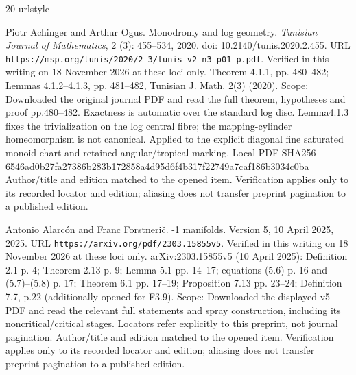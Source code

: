 \documentclass[11pt,a4paper]{article}
\theoremstyle{definition}
\begin{document}
\clearpage
\begin{thebibliography}{20}
\providecommand{\natexlab}[1]{#1}
\providecommand{\url}[1]{\texttt{#1}}
\expandafter\ifx\csname urlstyle\endcsname\relax
  \providecommand{\doi}[1]{doi: #1}\else
  \providecommand{\doi}{doi: \begingroup \urlstyle{rm}\Url}\fi

Piotr Achinger and Arthur Ogus.
\newblock Monodromy and log geometry.
\newblock \emph{Tunisian Journal of Mathematics}, 2 (3):
  455--534, 2020.
\newblock \doi{10.2140/tunis.2020.2.455}.
\newblock URL \url{https://msp.org/tunis/2020/2-3/tunis-v2-n3-p01-p.pdf}.
\newblock Verified in this writing on 18 November 2026 at these loci only.
  Theorem 4.1.1, pp. 480–482;\allowbreak{} Lemmas 4.1.2–4.1.3, pp. 481–482, Tunisian
  J. Math. 2(3) (2020). Scope: Downloaded the original journal PDF and read the
  full theorem, hypotheses and proof pp.480–482. Exactness is automatic over
  the standard log disc. Lemma4.1.3 fixes the trivialization on the log central
  fibre;\allowbreak{} the mapping-cylinder homeomorphism is not canonical. Applied to the
  explicit diagonal fine saturated monoid chart and retained angular/tropical
  marking. Local PDF SHA256
  6546ad0b27fa27386b283b172858a4d95d6f4b317f22749a7caf186b3034c0ba Author/title
  and edition matched to the opened item. Verification applies only to its
  recorded locator and edition;\allowbreak{} aliasing does not transfer preprint pagination
  to a published edition.

Antonio Alarc{\'o}n and Franc Forstneri{\v c}.
-1 manifolds.
\newblock Version 5, 10 April 2025, 2025.
\newblock URL \url{https://arxiv.org/pdf/2303.15855v5}.
\newblock Verified in this writing on 18 November 2026 at these loci only.
  arXiv:2303.15855v5 (10 April 2025): Definition 2.1 p. 4;\allowbreak{} Theorem 2.13 p. 9;\allowbreak{}
  Lemma 5.1 pp. 14–17;\allowbreak{} equations (5.6) p. 16 and (5.7)–(5.8) p. 17;\allowbreak{} Theorem
  6.1 pp. 17–19;\allowbreak{} Proposition 7.13 pp. 23–24;\allowbreak{} Definition 7.7, p.22
  (additionally opened for F3.9). Scope: Downloaded the displayed v5 PDF and
  read the relevant full statements and spray construction, including its
  noncritical/critical stages. Locators refer explicitly to this preprint, not
  journal pagination. Author/title and edition matched to the opened item.
  Verification applies only to its recorded locator and edition;\allowbreak{} aliasing does
  not transfer preprint pagination to a published edition.


\end{thebibliography}
\end{document}
